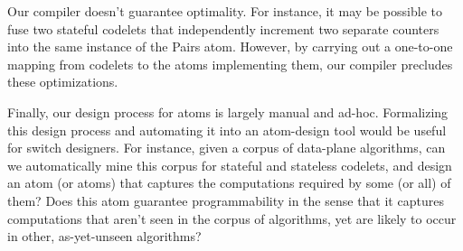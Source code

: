 \begin{CompactEnumerate}
\item Our compiler doesn't guarantee optimality. For instance, it may be
possible to fuse two stateful codelets that independently increment two
separate counters into the same instance of the Pairs atom. However, by
carrying out a one-to-one mapping from codelets to the atoms implementing them,
our compiler precludes these optimizations. 
\item Finally, our design process for atoms is largely manual and ad-hoc.
Formalizing this design process and automating it into an atom-design tool
would be useful for switch designers. For instance, given a corpus of
data-plane algorithms, can we automatically mine this corpus for stateful and
stateless codelets, and design an atom (or atoms) that captures the
computations required by some (or all) of them?  Does this atom guarantee
programmability in the sense that it captures computations that aren't seen in
the corpus of algorithms, yet are likely to occur in other, as-yet-unseen
algorithms?
\end{CompactEnumerate}
